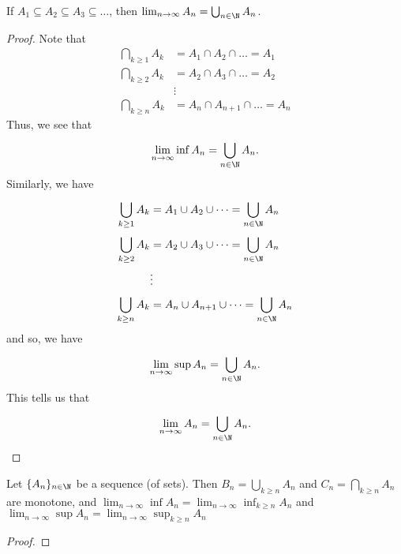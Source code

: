 
\begin{prop}
    If \( {A}_{1} \subseteq {A}_{2} \subseteq {A}_{3} \subseteq  \dots  \), then \( \lim_{ n \to \infty  }  {A}_{n} = \bigcup_{ n \in \N  }^{  }  {A}_{n} \).
\end{prop}

\begin{proof}
    Note that
    \begin{align*}
        \bigcap_{  k \geq 1  }^{  }  {A}_{k } &= {A}_{1} \cap {A}_{2} \cap  \dots = {A}_{1}  \\
        \bigcap_{  k \geq 2  }^{  }  {A}_{k} &= {A}_{2} \cap {A}_{3} \cap \dots = {A}_{2} \\
                                              &\vdots \\
        \bigcap_{ k \geq n  }^{} {A}_{k} &= {A}_{n} \cap {A}_{n+1} \cap \dots = {A}_{n}  
    \end{align*}
    Thus, we see that 
    \[  \lim_{ n \to \infty  }  \inf {A}_{n} = \bigcup_{ n \in \N  }^{  }  {A}_{n}. \]
    Similarly, we have
    \begin{align*}
        \bigcup_{ k \geq 1  }^{  }  {A}_{k } &= {A}_{1} \cup {A}_{2} \cup \dots = \bigcup_{ n \in \N  }^{   }  {A}_{n} \\
        \bigcup_{ k \geq 2  }^{  } {A}_{k} &=  {A}_{2} \cup {A}_{3} \cup \dots = \bigcup_{ n \in \N  }^{  }  {A}_{n} \\
                            &\vdots \\
        \bigcup_{ k \geq n  }^{   }  {A}_{k} &= {A}_{n} \cup {A}_{n+1} \cup \dots = \bigcup_{ n \in \N }^{  }  {A}_{n}  
    \end{align*}
    and so, we have
    \[ \lim_{ n \to \infty  } \sup {A}_{n} = \bigcup_{ n \in \N  }^{   }  {A}_{n}.  \]
    This tells us that 
    \[  \lim_{ n \to \infty  }  {A}_{n} = \bigcup_{ n \in \N  }^{  }  {A}_{n}. \]
\end{proof}

\begin{corollary}
    Let \( \{ {A}_{n} \}_{n \in \N} \) be a sequence (of sets). Then \( {B}_{n} = \bigcup_{ k \geq n  }^{  }  {A}_{n} \) and \( {C}_{n} = \bigcap_{  k \geq n  }^{  }  {A}_{n} \) are monotone, and \( \lim_{ n \to \infty  } \inf  {A}_{n} = \lim_{ n \to \infty  }  \inf_{k \geq n } {A}_{n} \) and \( \lim_{ n \to \infty  } \sup {A}_{n} = \lim_{ n \to \infty } \sup_{ k \geq n } {A}_{n}    \)
\end{corollary}

\begin{proof}
\end{proof}

